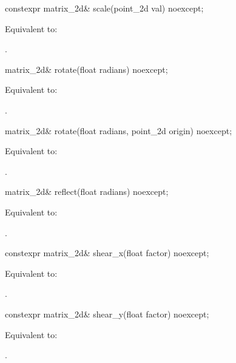%
\begin{itemdecl}
constexpr matrix_2d& scale(point_2d val) noexcept;
\end{itemdecl}
\begin{itemdescr}
\pnum
\effects
Equivalent to: 

\pnum
\returns
{}.
\end{itemdescr}

%
\begin{itemdecl}
matrix_2d& rotate(float radians) noexcept;
\end{itemdecl}
\begin{itemdescr}
\pnum
\effects
Equivalent to: 

\pnum
\returns
{}.
\end{itemdescr}

%
\begin{itemdecl}
matrix_2d& rotate(float radians, point_2d origin) noexcept;
\end{itemdecl}
\begin{itemdescr}
\pnum
\effects
Equivalent to: 

\pnum
\returns
{}.
\end{itemdescr}

%
\begin{itemdecl}
matrix_2d& reflect(float radians) noexcept;
\end{itemdecl}
\begin{itemdescr}
\pnum
\effects
Equivalent to: 

\pnum
\returns
{}.
\end{itemdescr}

%
\begin{itemdecl}
constexpr matrix_2d& shear_x(float factor) noexcept;
\end{itemdecl}
\begin{itemdescr}
\pnum
\effects
Equivalent to: 

\pnum
\returns
{}.
\end{itemdescr}

%
\begin{itemdecl}
constexpr matrix_2d& shear_y(float factor) noexcept;
\end{itemdecl}
\begin{itemdescr}
\pnum
\effects
Equivalent to: 

\pnum
\returns
{}.
\end{itemdescr}

